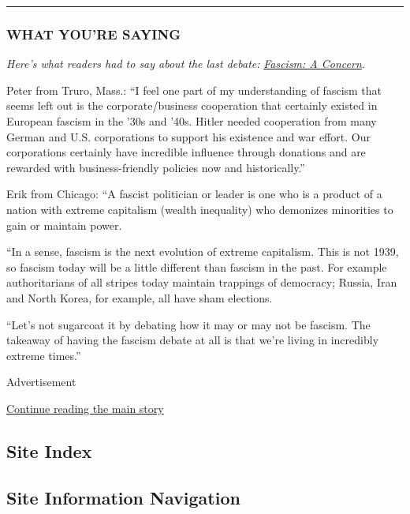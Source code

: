 \begin{center}\rule{0.5\linewidth}{\linethickness}\end{center}

\hypertarget{what-youre-saying}{%
\subsubsection{WHAT YOU'RE SAYING}\label{what-youre-saying}}

\emph{Here's what readers had to say about the last debate:}
\href{https://www.nytimes.com/2020/07/30/opinion/fascism-us.html}{\emph{Fascism:
A Concern}}\emph{.}

Peter from Truro, Mass.: ``I feel one part of my understanding of
fascism that seems left out is the corporate/business cooperation that
certainly existed in European fascism in the '30s and '40s. Hitler
needed cooperation from many German and U.S. corporations to support his
existence and war effort. Our corporations certainly have incredible
influence through donations and are rewarded with business-friendly
policies now and historically.''

Erik from Chicago: ``A fascist politician or leader is one who is a
product of a nation with extreme capitalism (wealth inequality) who
demonizes minorities to gain or maintain power.

``In a sense, fascism is the next evolution of extreme capitalism. This
is not 1939, so fascism today will be a little different than fascism in
the past. For example authoritarians of all stripes today maintain
trappings of democracy; Russia, Iran and North Korea, for example, all
have sham elections.

``Let's not sugarcoat it by debating how it may or may not be fascism.
The takeaway of having the fascism debate at all is that we're living in
incredibly extreme times.''

Advertisement

\protect\hyperlink{after-bottom}{Continue reading the main story}

\hypertarget{site-index}{%
\subsection{Site Index}\label{site-index}}

\hypertarget{site-information-navigation}{%
\subsection{Site Information
Navigation}\label{site-information-navigation}}

